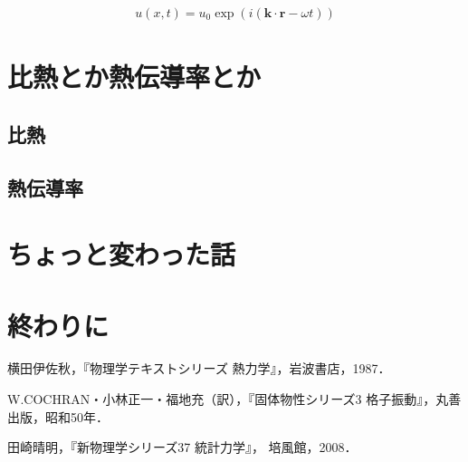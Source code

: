 \documentclass[10pt,b5paper,papersize,dvipdfmx]{jsbook}
\begin{document}
\begin{align}
  u(x,t) = u_0 \exp(i(\mathbf{k} \cdot \mathbf{r} - \omega t))
\end{align}

\section{比熱とか熱伝導率とか}
\subsection{比熱}
\subsection{熱伝導率}
\section{ちょっと変わった話}

\section{終わりに}

\begin{thebibliography}{99}
  \item 横田伊佐秋，『物理学テキストシリーズ 熱力学』，岩波書店，1987．
  \item W.COCHRAN・小林正一・福地充（訳），『固体物性シリーズ3 格子振動』，丸善出版，昭和50年．
  \item 田崎晴明，『新物理学シリーズ37 統計力学』， 培風館，2008．
\end{thebibliography}
\end{document}
